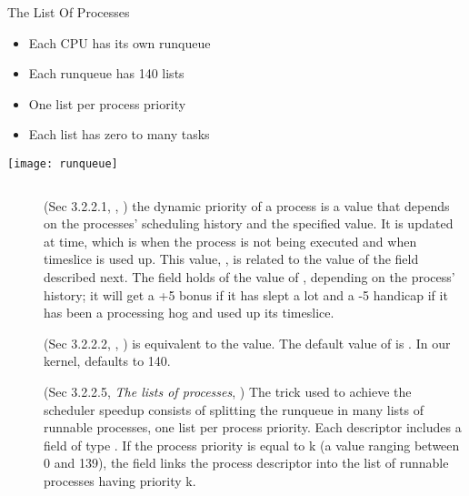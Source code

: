 \begin{frame}{The List Of  Processes}
  \begin{varwidth}{.69\textwidth}
    \begin{itemize}
    \item Each CPU has its own runqueue
    \item Each runqueue has 140 lists
    \item One list per process priority
    \item Each list has zero to many tasks
    \end{itemize}
  \end{varwidth}\hfill
  \begin{varwidth}{.3\textwidth}
    \texttt{[image: runqueue]}
  \end{varwidth}
  \vspace{2em}
  \begin{center}
    \begin{varwidth}{.5\textwidth}
      \inputminted{c}{../figs/run-list.c}
    \end{varwidth}
  \end{center}
\end{frame}

\begin{description}
\item[] (Sec 3.2.2.1, \emph{}, \cite{rodriguez2005linux}) the
  dynamic priority of a process is a value that depends on the processes' scheduling
  history and the specified  value. It is updated at  time, which
  is when the process is not being executed and when timeslice is used up. This value,
  , is related to the value of the  field described
  next. The  field holds  of the value of ,
  depending on the process' history; it will get a +5 bonus if it has slept a lot and a -5
  handicap if it has been a processing hog and used up its timeslice.
\item[] (Sec 3.2.2.2, \emph{},
  \cite{rodriguez2005linux}) is equivalent to the  value. The default value of
   is . In our kernel,  defaults to
  140.
\item[] (Sec 3.2.2.5, \emph{The lists of  processes},
  \cite{bovet2005understanding}) The trick used to achieve the scheduler speedup consists
  of splitting the runqueue in many lists of runnable processes, one list per process
  priority. Each  descriptor includes a  field of type
  . If the process priority is equal to k (a value ranging between 0 and
  139), the  field links the process descriptor into the list of runnable
  processes having priority k.
\end{description}

